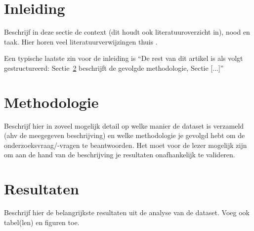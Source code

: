 \documentclass[fleqn,10pt]{artikeltin}
\affiliation{\textbf{Contact:}
  \textsuperscript{1} \href{mailto:voornaam.naam@student.hogent.be}{voornaam.naam@student.hogent.be}}
\begin{document}
\maketitle %
\tableofcontents %
\thispagestyle{empty} %



\section{Inleiding} %
\label{sec:inleiding}

Beschrijf in deze sectie de context (dit houdt ook literatuuroverzicht in), nood en taak. Hier horen veel literatuurverwijzingen thuis \autocite{VanVreckem2017}.

Een typische laatste zin voor de inleiding is ``De rest van dit artikel is als volgt gestructureerd: Sectie~\ref{sec:methodologie} beschrijft de gevolgde methodologie, Sectie [...]''

\section{Methodologie}
\label{sec:methodologie}

Beschrijf hier in zoveel mogelijk detail op welke manier de dataset is verzameld (ahv de meegegeven beschrijving) en welke methodologie je gevolgd hebt om de onderzoeksvraag/-vragen te beantwoorden. Het moet voor de lezer mogelijk zijn om aan de hand van de beschrijving je resultaten onafhankelijk te valideren.

\section{Resultaten}
\label{sec:resultaten}

Beschrijf hier de belangrijkste resultaten uit de analyse van de dataset. Voeg ook tabel(len) en figuren toe.
\end{document}
